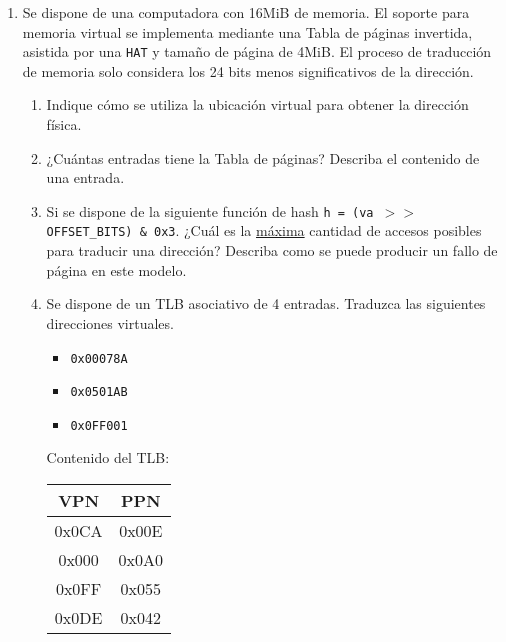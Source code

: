 \documentclass{article}
\begin{document}
\begin{enumerate}
\item Se dispone de una computadora con 16MiB de memoria. El soporte para memoria virtual se implementa mediante una Tabla de páginas invertida, asistida por una \texttt{HAT} y tamaño de página de  4MiB. El proceso de traducción de memoria solo considera los 24 bits menos significativos de la dirección.

\begin{enumerate}
    \item Indique cómo se utiliza la ubicación virtual para obtener la dirección física.
    \item ¿Cuántas entradas tiene la Tabla de páginas? Describa el contenido de una entrada.
    \item Si se dispone de la siguiente función de hash \texttt{h = (va $>>$ OFFSET\_BITS) \& 0x3}. ¿Cuál es la \underline{máxima} cantidad de accesos posibles para traducir una dirección? Describa como se puede producir un fallo de página en este modelo.
    \item Se dispone de un TLB asociativo de 4 entradas. Traduzca las siguientes direcciones virtuales.
    
    \begin{itemize}
        \item \texttt{0x00078A}
        \item \texttt{0x0501AB}
        \item \texttt{0x0FF001}
    \end{itemize}
    
    Contenido del TLB:
    \begin{center}
    \begin{tabular}{|c|c|}
    \hline
        VPN & PPN   \\
        \hline
        0x0CA & 0x00E \\
        0x000 & 0x0A0 \\
        0x0FF & 0x055 \\
        0x0DE & 0x042 \\
        \hline
    \end{tabular}
    \end{center}
\end{enumerate}\end{enumerate}
\end{document}
